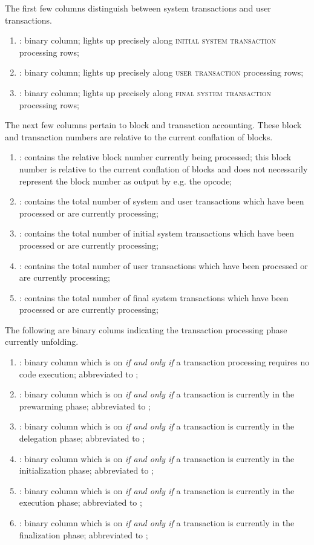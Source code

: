 The first few columns distinguish between system transactions and user transactions.
\begin{enumerate}
	\item \sysi{}:
		binary column;
		lights up precisely along \textsc{initial system transaction} processing rows;
	\item \user{}:
		binary column;
		lights up precisely along \textsc{user transaction} processing rows;
	\item \sysf{}:
		binary column;
		lights up precisely along \textsc{final system transaction} processing rows;
\end{enumerate}
The next few columns pertain to block and transaction accounting.
These block and transaction numbers are relative to the current conflation of blocks.
\begin{enumerate}[resume]
	\item \blockNumber:
		contains the relative block number currently being processed;
		this block number is relative to the current conflation of blocks and does not necessarily represent the
		block number as output by e.g. the  opcode;
	\item \totalTransactionNumber:
		contains the total number of system and user transactions which have been processed or are currently processing;
	\item \sysiTransactionNumber:
		contains the total number of initial system transactions which have been processed or are currently processing;
	\item \userTransactionNumber:
		contains the total number of user transactions which have been processed or are currently processing;
	\item \sysfTransactionNumber:
		contains the total number of final system transactions which have been processed or are currently processing;
\end{enumerate}
\noindent The following are binary colums indicating the transaction processing phase currently unfolding.
\begin{enumerate}[resume]
	\item \TXSKIP{}:
		binary column which is on \emph{if and only if} a transaction processing requires no code execution; abbreviated to \txSkip{};
	\item \TXWARM{}:
		binary column which is on \emph{if and only if} a transaction is currently in the prewarming phase; abbreviated to \txWarm{};
	\item \TXAUTH{}:
		binary column which is on \emph{if and only if} a transaction is currently in the delegation phase; abbreviated to \txAuth{};
	\item \TXINIT{}:
		binary column which is on \emph{if and only if} a transaction is currently in the initialization phase; abbreviated to \txInit{};
	\item \TXEXEC{}:
		binary column which is on \emph{if and only if} a transaction is currently in the execution phase; abbreviated to \txExec{};
	\item \TXFINL{}:
		binary column which is on \emph{if and only if} a transaction is currently in the finalization phase; abbreviated to \txFinl{};
\end{enumerate}

